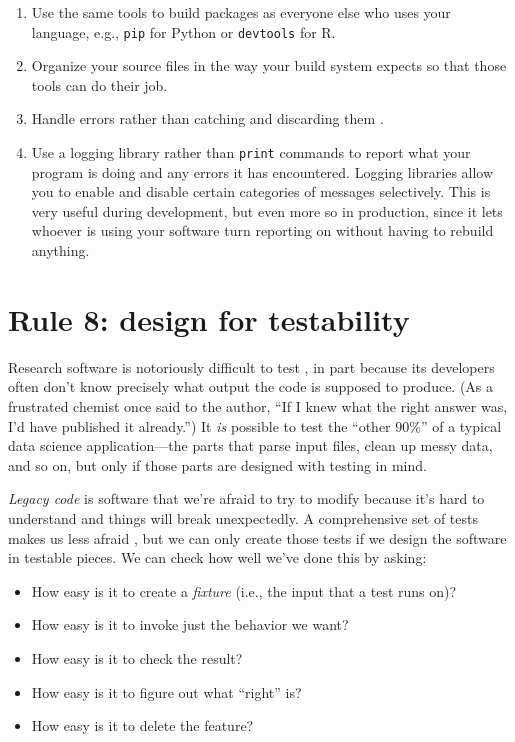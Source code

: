 \documentclass[10pt,letterpaper]{article}
\begin{document}
\begin{enumerate}

\item
  Use the same tools to build packages as everyone else who uses your language,
  e.g., \texttt{pip} for Python or \texttt{devtools} for R.

\item
  Organize your source files in the way your build system expects
  so that those tools can do their job.

\item
  Handle errors rather than catching and discarding them \cite{Nakshatri2016}.

\item
  Use a logging library rather than \texttt{print} commands
  to report what your program is doing and any errors it has encountered.
  Logging libraries allow you to enable and disable certain categories of messages selectively.
  This is very useful during development,
  but even more so in production,
  since it lets whoever is using your software turn reporting on
  without having to rebuild anything.

\end{enumerate}

\section*{Rule 8: design for testability}

Research software is notoriously difficult to test \cite{Hook2009,Kanewala2014},
in part because its developers often don't know precisely what output the code is supposed to produce.
(As a frustrated chemist once said to the author,
``If I knew what the right answer was, I'd have published it already.'')
It \emph{is} possible to test the ``other 90\%'' of a typical data science application---the parts that
parse input files,
clean up messy data,
and so on,
but only if those parts are designed with testing in mind.

\emph{Legacy code} is software that we're afraid to try to modify
because it's hard to understand and things will break unexpectedly.
A comprehensive set of tests makes us less afraid \cite{Feathers2004},
but we can only create those tests if we design the software in testable pieces.
We can check how well we've done this by asking:

\begin{itemize}
\item
  How easy is it to create a \emph{fixture}
  (i.e., the input that a test runs on)?
\item
  How easy is it to invoke just the behavior we want?
\item
  How easy is it to check the result?
\item
  How easy is it to figure out what ``right'' is?
\item
  How easy is it to delete the feature?
\end{itemize}
\end{document}
